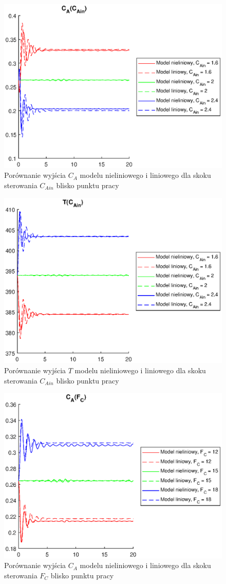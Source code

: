\begin{figure}
	\centering
	\includegraphics[width=.8\linewidth]{plot/lin_cacain_0.eps}
	\caption{Porównanie wyjścia $C_A$ modelu nieliniowego i liniowego dla skoku sterowania $C_{Ain}$ blisko punktu pracy}
	\label{fig:lincacain0}
\end{figure}
\begin{figure}
\centering
\includegraphics[width=.8\linewidth]{plot/lin_tcain_0.eps}
\caption{Porównanie wyjścia $T$ modelu nieliniowego i liniowego dla skoku sterowania $C_{Ain}$ blisko punktu pracy}
\end{figure}
\begin{figure}
\centering
\includegraphics[width=.8\linewidth]{plot/lin_cafc_0.eps}
\caption{Porównanie wyjścia $C_A$ modelu nieliniowego i liniowego dla skoku sterowania $F_C$ blisko punktu pracy}
\end{figure}
